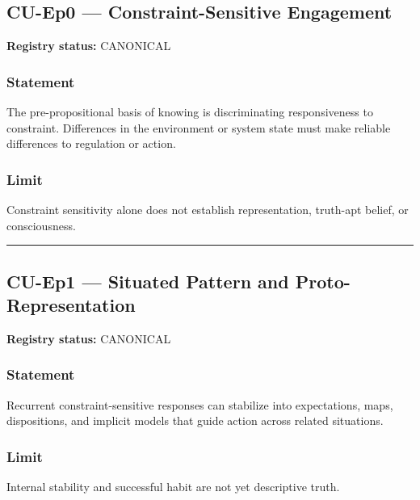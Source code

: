\documentclass[
  11pt,
]{article}
\begin{document}
\subsection{CU-Ep0 --- Constraint-Sensitive
Engagement}\label{cu-ep0-constraint-sensitive-engagement}

\textbf{Registry status:} CANONICAL

\subsubsection{Statement}\label{statement-34}

The pre-propositional basis of knowing is discriminating responsiveness
to constraint. Differences in the environment or system state must make
reliable differences to regulation or action.

\subsubsection{Limit}\label{limit}

Constraint sensitivity alone does not establish representation,
truth-apt belief, or consciousness.

\begin{center}\rule{0.5\linewidth}{0.5pt}\end{center}

\subsection{CU-Ep1 --- Situated Pattern and
Proto-Representation}\label{cu-ep1-situated-pattern-and-proto-representation}

\textbf{Registry status:} CANONICAL

\subsubsection{Statement}\label{statement-35}

Recurrent constraint-sensitive responses can stabilize into
expectations, maps, dispositions, and implicit models that guide action
across related situations.

\subsubsection{Limit}\label{limit-1}

Internal stability and successful habit are not yet descriptive truth.
\end{document}
